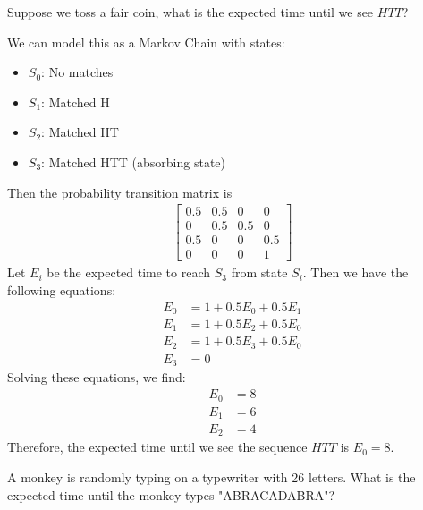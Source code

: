 \documentclass[answers,12pt,addpoints]{exam}
\begin{document}
\begin{questions}
    \question Suppose we toss a fair coin, what is the expected time until we see $HTT$?
    \begin{solution}
        We can model this as a Markov Chain with states:
        \begin{itemize}
            \item $S_0$: No matches
            \item $S_1$: Matched H
            \item $S_2$: Matched HT
            \item $S_3$: Matched HTT (absorbing state)
        \end{itemize}
        Then the probability transition matrix is
        \begin{align*}
            \begin{bmatrix}
                0.5 & 0.5 & 0 & 0 \\
                0 & 0.5 & 0.5 & 0 \\
                0.5 & 0 & 0 & 0.5 \\
                0 & 0 & 0 & 1
            \end{bmatrix}
        \end{align*}
        Let $E_i$ be the expected time to reach $S_3$ from state $S_i$. Then we have the following equations:
        \begin{align*}
            E_0 &= 1 + 0.5E_0 + 0.5E_1 \\
            E_1 &= 1 + 0.5E_2 + 0.5E_0 \\
            E_2 &= 1 + 0.5E_3 + 0.5E_0 \\
            E_3 &= 0
        \end{align*}
        Solving these equations, we find:
        \begin{align*}
            E_0 &= 8 \\
            E_1 &= 6 \\
            E_2 &= 4
        \end{align*}
        Therefore, the expected time until we see the sequence $HTT$ is $E_0 = 8$.
    \end{solution}
    \question A monkey is randomly typing on a typewriter with 26 letters. What is the expected time until the monkey types "ABRACADABRA"?
\end{questions}
\end{document}

